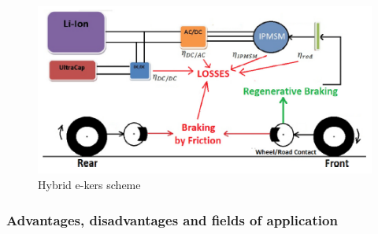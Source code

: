 \documentclass[11pt]{article}
\begin{document}
\begin{figure}[H]
	\centering
	\includegraphics[width=.6\textwidth]{Images/State_of_the_art/Electric_KERS_powerflow.PNG}
	\caption{Hybrid e-kers scheme}
	\label{ekersschemepowerflow}
\end{figure}


\subsubsection{Advantages, disadvantages and fields of application}
\end{document}
